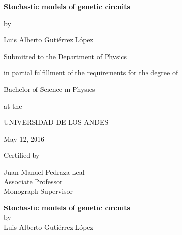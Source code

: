 \documentclass[12pt,letterpaper,twoside,openright]{report}
\begin{document}
\begin{titlepage}
	\centering \large
	{\Large \bf Stochastic models of genetic circuits\par}
        \vspace{0.3cm}
        {by\par}
        \vspace{0.3cm}
	{\Large Luis Alberto Guti\'errez L\'opez \par}
        \vspace{2cm}
        {
	{Submitted to the Department of Physics\par}
        {in partial fulfillment of the requirements for the degree of \par}}
        \vspace{.25cm}
	{Bachelor of Science in Physics\par}
        \vspace{.25cm}
        {at the\par}
        \vspace{.25cm}
        {UNIVERSIDAD DE LOS ANDES\par}
        \vspace{.25cm}
        {May 12, 2016}

        \vspace{1.8cm}


        Certified by \dotfill \par
        \raggedleft Juan Manuel Pedraza Leal \\ Associate Professor \\ Monograph Supervisor
	\vfill
\end{titlepage}

\cleardoublepage

\begin{center}

{\large \bf Stochastic models of genetic circuits} \\
by \\
{\large Luis Alberto Guti\'errez L\'opez}

\vspace{1.0cm}

\end{center}
\par
\end{document}
